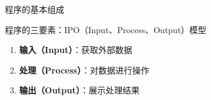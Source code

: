 \documentclass[UTF8,aspectratio=169]{beamer}
\begin{document}
\begin{frame}{程序的基本组成}
    \begin{ytublock}{程序的三要素：IPO（Input、Process、Output）模型}
        \begin{enumerate}
            \item \textbf{输入（Input）}：获取外部数据
                \begin{itemize}
                \end{itemize}
            \item \textbf{处理（Process）}：对数据进行操作
                \begin{itemize}
                \end{itemize}
            \item \textbf{输出（Output）}：展示处理结果
                \begin{itemize}
                \end{itemize}
        \end{enumerate}
    \end{ytublock}
\end{frame}
\end{document}
